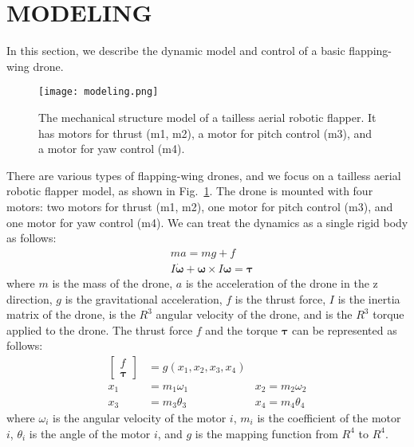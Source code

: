 \section{MODELING}
\label{sec:modeling}
In this section, we describe the dynamic model and control of a basic flapping-wing drone.
\begin{figure}[t]
    \centering
    \texttt{[image: modeling.png]}
    \caption{The mechanical structure model of a tailless aerial robotic flapper. It has motors for thrust (m1, m2), a motor for pitch control (m3), and a motor for yaw control (m4).}
    \label{figure:modeling}
  \end{figure}
There are various types of flapping-wing drones, and we focus on a tailless aerial robotic flapper model\cite{karasek2018tailless}, as shown in Fig.~\ref{figure:modeling}.
The drone is mounted with four motors: two motors for thrust (m1, m2), one motor for pitch control (m3), and one motor for yaw control (m4).
We can treat the dynamics as a single rigid body as follows:
\begin{equation}
    \begin{aligned}
      &ma = mg + f\\
      &I\dot{\bm{\omega}} + \bm{\omega} \times I\bm{\omega} = \bm{\tau}
    \end{aligned}
\end{equation}
where $m$ is the mass of the drone, $a$ is the acceleration of the drone in the z direction, $g$ is the gravitational acceleration, $f$ is the thrust force, $I$ is the inertia matrix of the drone, \bm{$\omega$} is the $R^3$ angular velocity of the drone, and \bm{$\tau$} is the $R^3$ torque applied to the drone.
The thrust force $f$ and the torque $\bm{\tau}$ can be represented as follows:
\begin{equation}
  \label{eq:control}
  \begin{aligned}
    \begin{bmatrix}
      f\\
      \bm{\tau}
    \end{bmatrix}
    &=
    g(x_1, x_2, x_3, x_4)\\
    x_1 &= m_1\omega_1&
    x_2 = m_2\omega_2\\
    x_3 &= m_3\theta_3&
    x_4 = m_4\theta_4
  \end{aligned}
\end{equation}
where $\omega_i$ is the angular velocity of the motor $i$, $m_i$ is the coefficient of the motor $i$, $\theta_i$ is the angle of the motor $i$, and $g$ is the mapping function from $R^4$ to $R^4$.

